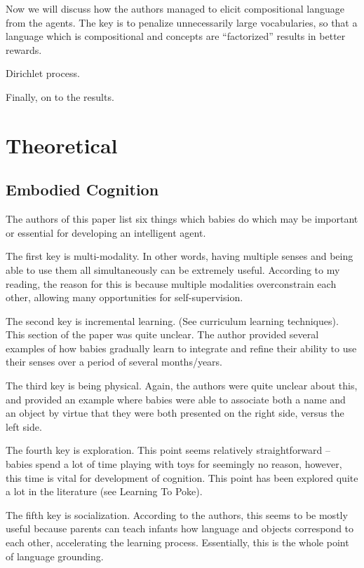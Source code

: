 \documentclass[12pt]{article}
\begin{document}
Now we will discuss how the authors managed to elicit compositional language from the agents. The key is to penalize unnecessarily large vocabularies, so that a language which is compositional and concepts are ``factorized'' results in better rewards.

Dirichlet process.


Finally, on to the results.

\section{Theoretical}
\subsection{Embodied Cognition \cite{EmbodiedCognition}}

The authors of this paper list six things which babies do which may be important or essential for developing an intelligent agent.

The first key is multi-modality. In other words, having multiple senses and being able to use them all simultaneously can be extremely useful. According to my reading, the reason for this is because multiple modalities overconstrain each other, allowing many opportunities for self-supervision. 

The second key is incremental learning. (See curriculum learning techniques). This section of the paper was quite unclear. The author provided several examples of how babies gradually learn to integrate and refine their ability to use their senses over a period of several months/years.

The third key is being physical. Again, the authors were quite unclear about this, and provided an example where babies were able to associate both a name and an object by virtue that they were both presented on the right side, versus the left side.

The fourth key is exploration. This point seems relatively straightforward -- babies spend a lot of time playing with toys for seemingly no reason, however, this time is vital for development of cognition. This point has been explored quite a lot in the literature (see Learning To Poke).

The fifth key is socialization. According to the authors, this seems to be mostly useful because parents can teach infants how language and objects correspond to each other, accelerating the learning process. Essentially, this is the whole point of language grounding.
\end{document}
